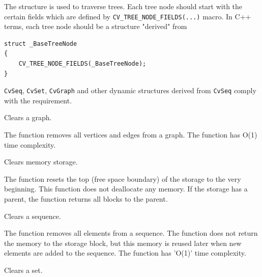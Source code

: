 The structure  is used to traverse trees. Each tree node should start with the certain fields which are defined by \texttt{CV\_TREE\_NODE\_FIELDS(...)} macro. In C++ terms, each tree node should be a structure "derived" from

\begin{lstlisting}
struct _BaseTreeNode
{
    CV_TREE_NODE_FIELDS(_BaseTreeNode);
}
\end{lstlisting}

\texttt{CvSeq}, \texttt{CvSet}, \texttt{CvGraph} and other dynamic structures derived from \texttt{CvSeq} comply with the requirement.

Clears a graph.


\begin{description}
\end{description}

The function removes all vertices and edges from a graph. The function has O(1) time complexity.

Clears memory storage.


\begin{description}
\end{description}

The function resets the top (free space
boundary) of the storage to the very beginning. This function does not
deallocate any memory. If the storage has a parent, the function returns
all blocks to the parent.

Clears a sequence.


\begin{description}
\end{description}

The function removes all elements from a
sequence. The function does not return the memory to the storage block, but this
memory is reused later when new elements are added to the sequence. The function has
'O(1)' time complexity.


Clears a set.


